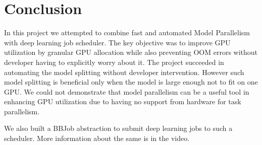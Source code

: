 \section{Conclusion}

In this project we attempted to combine fast and automated Model Parallelism with deep learning job scheduler. The key objective was to improve GPU utilization by granular GPU allocation while also preventing OOM errors without developer having to explicitly worry about it. The project succeeded in automating the model splitting without developer intervention. However such model splitting is beneficial only when the model is large enough not to fit on one GPU. We could not demonstrate that model parallelism can be a useful tool in enhancing GPU utilization due to having no support from hardware for task parallelism.

We also built a BBJob abstraction to submit deep learning jobs to such a scheduler. More information about the same is in the video.
